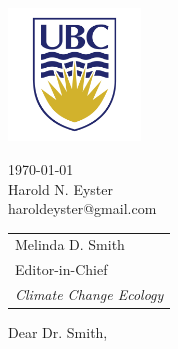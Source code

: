 \documentclass[11pt]{article}
\begin{document}
	\hspace{2.8in}
	\begin{minipage}{2in}
	\includegraphics[width=100pt]{ubc}
	\end{minipage}
\hfill
	\begin{minipage}{3in}
	\today \\[\jot]
	Harold N. Eyster\\
	haroldeyster@gmail.com
	\end{minipage}
	\medskip
	\begin{tabular}{@{}l}
		Melinda D. Smith\\
		Editor-in-Chief \\
		\textit{Climate Change Ecology} \\
	\end{tabular}
	
	\bigskip
	
	Dear Dr. Smith,
\end{document}
